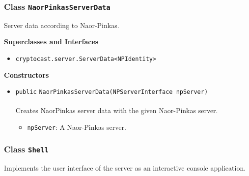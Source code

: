 \subsubsection{Class \lstinline|NaorPinkasServerData|}
Server data according to Naor-Pinkas. \\
\noindent\begin{minipage}[t]{5cm}
\vspace{0.3em}
\hspace*{2em}
\vspace{0.3em}
\end{minipage}



\textbf{\sffamily Superclasses and Interfaces}
\begin{itemize}
\item \lstinline|cryptocast.server.ServerData<NPIdentity>|
\end{itemize}


\textbf{\sffamily Constructors}
\begin{itemize}
\item \lstinline|public| \lstinline|NaorPinkasServerData|\lstinline|(NPServerInterface npServer)|\\ \\[-0.6em]
Creates NaorPinkas server data with the given Naor-Pinkas server.
\begin{itemize}
\item \lstinline|npServer|: A Naor-Pinkas server.
\end{itemize}



\end{itemize}


\subsubsection{Class \lstinline|Shell|}
Implements the user interface of the server as an interactive console application. \\
\noindent\begin{minipage}[t]{5cm}
\vspace{0.3em}
\hspace*{2em}
\vspace{0.3em}
\end{minipage}



